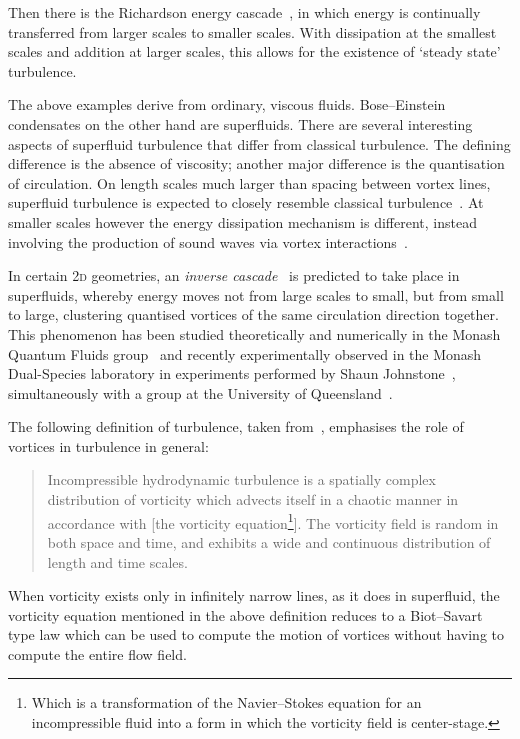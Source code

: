 Then there is the Richardson energy cascade~\cite{richardson_weather_2007}, in which energy is continually transferred from larger scales to smaller scales. With dissipation at the smallest scales and addition at larger scales, this allows for the existence of `steady state' turbulence.

The above examples derive from ordinary, viscous fluids. Bose--Einstein condensates on the other hand are superfluids. There are several interesting aspects of superfluid turbulence that differ from classical turbulence. The defining difference is the absence of viscosity; another major difference is the quantisation of circulation. On length scales much larger than spacing between vortex lines, superfluid turbulence is expected to closely resemble classical turbulence~\cite{tsubota_energy_2009}. At smaller scales however the energy dissipation mechanism is different, instead involving the production of sound waves via vortex interactions~\cite{tsubota_energy_2009, vinen_how_2005}.

In certain 2\textsc{d} geometries, an \emph{inverse cascade}~\cite{onsager_statistical_1949, kraichnan_inertial_1967} is predicted to take place in superfluids, whereby energy moves not from large scales to small, but from small to large, clustering quantised vortices of the same circulation direction together. This phenomenon has been studied theoretically and numerically in the Monash Quantum Fluids group~\cite{simula_emergence_2014, groszek_vortex_2018} and recently experimentally observed in the Monash Dual-Species laboratory in experiments performed by Shaun Johnstone~\cite{johnstone_order_2018}, simultaneously with a group at the University of Queensland~\cite{gauthier_negative-temperature_2018}.

The following definition of turbulence, taken from~\cite[p 53]{davidson_turbulence:_2004}, emphasises the role of vortices in turbulence in general:
\begin{quote}
Incompressible hydrodynamic turbulence is a spatially complex distribution of vorticity which advects itself in a chaotic manner in accordance with [the vorticity equation\footnote{Which is a transformation of the Navier--Stokes equation for an incompressible fluid into a form in which the vorticity field is center-stage.}]. The vorticity field is random in both space and time, and exhibits a wide and continuous distribution of length and time scales.
\end{quote}

When vorticity exists only in infinitely narrow lines, as it does in superfluid, the vorticity equation mentioned in the above definition reduces to a Biot--Savart type law which can be used to compute the motion of vortices without having to compute the entire flow field.

